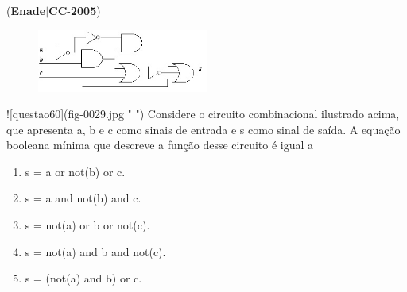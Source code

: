 \documentclass{exam}
\begin{document}
\begin{questions}
\question (\textbf{Enade}$|$\textbf{CC}-\textbf{2005}) \begin{figure}[H]
	\begin{center}
		\includegraphics[width=0.5\textwidth]{CIENCIA_DA_COMPUTACAO_Prova2005-utf8_figuras/fig-0029.jpg}
		\caption{ }
	\end{center}
\end{figure}
![questao60](fig-0029.jpg " ")
Considere o circuito combinacional ilustrado acima, que apresenta
a, b e c como sinais de entrada e s como sinal de saída. A equação
booleana mínima que descreve a função desse circuito é igual a
	\begin{enumerate}[label=\alph*)]
		\item  s = a or not(b) or c.
		\item  s = a and not(b) and c.
		\item  s = not(a) or b or not(c).
		\item  s = not(a) and b and not(c).
		\item  s = (not(a) and b) or c.

	\end{enumerate}


\end{questions}
\end{document}
